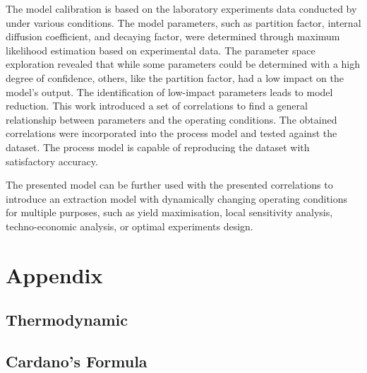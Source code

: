 \documentclass[a4paper,fleqn]{cas-dc}
\begin{document}
The model calibration is based on the laboratory experiments data conducted by \citet{Povh2001} under various conditions. The model parameters, such as partition factor, internal diffusion coefficient, and decaying factor, were determined through maximum likelihood estimation based on experimental data. The parameter space exploration revealed that while some parameters could be determined with a high degree of confidence, others, like the partition factor, had a low impact on the model's output. The identification of low-impact parameters leads to model reduction. This work introduced a set of correlations to find a general relationship between parameters and the operating conditions. The obtained correlations were incorporated into the process model and tested against the dataset. The process model is capable of reproducing the dataset with satisfactory accuracy.

The presented model can be further used with the presented correlations to introduce an extraction model with dynamically changing operating conditions for multiple purposes, such as yield maximisation, local sensitivity analysis, techno-economic analysis, or optimal experiments design.

\newpage
%



\clearpage \appendix \label{appendix}
\section{Appendix} 

%

\subsection{Thermodynamic}
 \label{CH: EOS}

\subsection{Cardano's Formula} \label{CH: Cardano}

\end{document}
